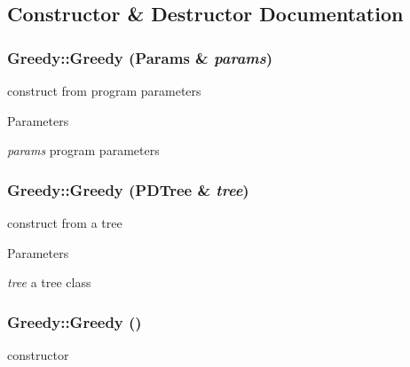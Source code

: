 \subsection{Constructor \& Destructor Documentation}
\hypertarget{classGreedy_a1aeec7fbb70ebb2abe0fcb97f21995d8}{
\subsubsection[{Greedy}]{\setlength{\rightskip}{0pt plus 5cm}Greedy::Greedy ({\bf Params} \& {\em params})}}
\label{classGreedy_a1aeec7fbb70ebb2abe0fcb97f21995d8}
construct from program parameters 
\begin{DoxyParams}{Parameters}
\item[{\em params}]program parameters \end{DoxyParams}
\hypertarget{classGreedy_ab5f9558f6a84338ab866c11bffa934cc}{
\subsubsection[{Greedy}]{\setlength{\rightskip}{0pt plus 5cm}Greedy::Greedy ({\bf PDTree} \& {\em tree})}}
\label{classGreedy_ab5f9558f6a84338ab866c11bffa934cc}
construct from a tree 
\begin{DoxyParams}{Parameters}
\item[{\em tree}]a tree class \end{DoxyParams}
\hypertarget{classGreedy_a916c0ab051f780c4d3ccec06f44bbf6c}{
\subsubsection[{Greedy}]{\setlength{\rightskip}{0pt plus 5cm}Greedy::Greedy ()}}
\label{classGreedy_a916c0ab051f780c4d3ccec06f44bbf6c}
constructor 

